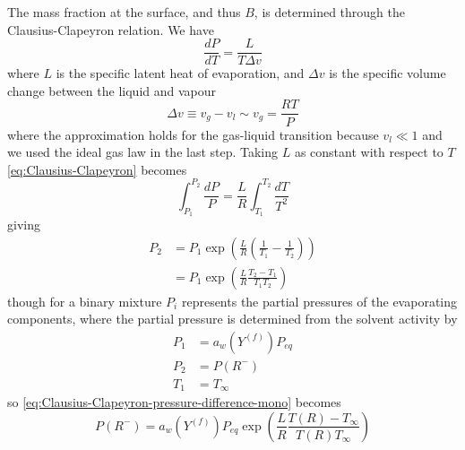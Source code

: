 \documentclass[12pt,twoside]{report}
\begin{document}
The mass fraction at the surface, and thus $B$, is determined through the Clausius-Clapeyron relation.
We have
\begin{equation}\label{eq:Clausius-Clapeyron}
  \frac{d P}{dT} = \frac{L}{T \Delta v}
\end{equation}
where $L$ is the specific latent heat of evaporation, and $\Delta v$ is the specific volume change between the liquid and vapour
\begin{equation}
  \Delta v
  \equiv v_g - v_l
  \sim v_g
  = \frac{RT}{P}
\end{equation}
where the approximation holds for the gas-liquid transition because $v_l \ll 1$ and we used the ideal gas law in the last step.
Taking $L$ as constant with respect to $T$ \eqref{eq:Clausius-Clapeyron} becomes
\begin{equation}
  \int_{P_1}^{P_2} \frac{d P}{P} =
  \frac{L}{R} \int_{T_1}^{T_2} \frac{dT}{T^2}
\end{equation}
giving
\begin{equation}\label{eq:Clausius-Clapeyron-pressure-difference-mono}
  \begin{aligned}
    P_2 &=
    P_1 \exp{\left( \frac{L}{R} \left(\frac{1}{T_1} - \frac{1}{T_2} \right) \right)} \\
    &=
    P_1 \exp{\left( \frac{L}{R} \frac{T_2 - T_1}{T_1 T_2} \right)}
  \end{aligned}
\end{equation}
though for a binary mixture $P_i$ represents the partial pressures of the evaporating components,
where the partial pressure is determined from the solvent activity by
\begin{subequations}
  \begin{align}
    P_1 &= a_w(Y^{(f)}) P_{eq} \\
    P_2 &= P(R^-) \\
    T_1 &= T_\infty
  \end{align}
\end{subequations}
so \eqref{eq:Clausius-Clapeyron-pressure-difference-mono} becomes
\begin{equation}\label{eq:Clausius-Clapeyron-pressure-difference-binary}
  P(R^-) =
  a_w(Y^{(f)}) P_{eq}
  \exp{\left( \frac{L}{R} \frac{T(R) - T_\infty}{T(R) T_\infty} \right)}
\end{equation}
\end{document}
